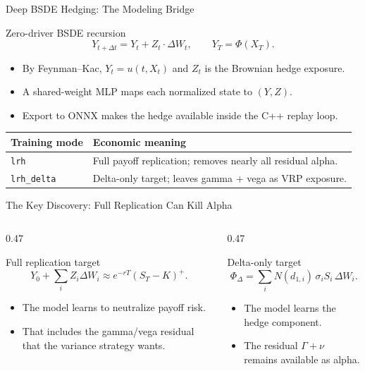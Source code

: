 \documentclass[11pt,aspectratio=169]{beamer}
\newcommand{\1}{\mathbf{1}}
\begin{document}
\begin{frame}{Deep BSDE Hedging: The Modeling Bridge}
    \small
    \begin{block}{Zero-driver BSDE recursion}
    \[
        Y_{t+\Delta t}
        =
        Y_t
        +
        Z_t \cdot \Delta W_t,
        \qquad
        Y_T=\Phi(X_T).
    \]
    \end{block}
    \begin{itemize}
        \item By Feynman--Kac, $Y_t=u(t,X_t)$ and $Z_t$ is the Brownian hedge exposure.
        \item A shared-weight MLP maps each normalized state to $(Y,Z)$.
        \item Export to ONNX makes the hedge available inside the C++ replay loop.
    \end{itemize}
    \vspace{2pt}
    \begin{center}
    \begin{tabular}{ll}
    \toprule
    \textbf{Training mode} & \textbf{Economic meaning} \\
    \midrule
    \texttt{lrh} & Full payoff replication; removes nearly all residual alpha. \\
    \texttt{lrh\_delta} & Delta-only target; leaves gamma + vega as VRP exposure. \\
    \bottomrule
    \end{tabular}
    \end{center}
\end{frame}

\begin{frame}{The Key Discovery: Full Replication Can Kill Alpha}
    \small
    \begin{columns}[T,onlytextwidth]
    \begin{column}{0.47\textwidth}
    \begin{block}{Full replication target}
    \[
        Y_0+\sum_i Z_i\Delta W_i
        \approx
        e^{-rT}(S_T-K)^+.
    \]
    \end{block}
    \begin{itemize}
        \item The model learns to neutralize payoff risk.
        \item That includes the gamma/vega residual that the variance strategy wants.
    \end{itemize}
    \end{column}
    \begin{column}{0.47\textwidth}
    \begin{alertblock}{Delta-only target}
    \[
        \Phi_{\Delta}
        =
        \sum_i N(d_{1,i})\,
        \sigma_i S_i\,
        \Delta W_i.
    \]
    \end{alertblock}
    \begin{itemize}
        \item The model learns the hedge component.
        \item The residual $\Gamma+\nu$ remains available as alpha.
    \end{itemize}
    \end{column}
    \end{columns}
\end{frame}
\end{document}
